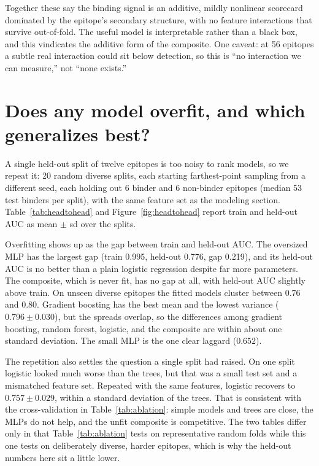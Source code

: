 \documentclass[11pt]{article}
\begin{document}
Together these say the binding signal is an additive, mildly nonlinear scorecard dominated by the
epitope's secondary structure, with no feature interactions that survive out-of-fold. The useful model is
interpretable rather than a black box, and this vindicates the additive form of the composite. One caveat:
at 56 epitopes a subtle real interaction could sit below detection, so this is ``no interaction we can
measure,'' not ``none exists.''

\section{Does any model overfit, and which generalizes best?}

A single held-out split of twelve epitopes is too noisy to rank models, so we repeat it: 20 random
diverse splits, each starting farthest-point sampling from a different seed, each holding out 6 binder
and 6 non-binder epitopes (median 53 test binders per split), with the same feature set as the modeling
section. Table~\ref{tab:headtohead} and Figure~\ref{fig:headtohead} report train and held-out AUC as
mean $\pm$ sd over the splits.

Overfitting shows up as the gap between train and held-out AUC. The oversized MLP has the largest gap
(train 0.995, held-out 0.776, gap 0.219), and its held-out AUC is no better than a plain logistic
regression despite far more parameters. The composite, which is never fit, has no gap at all, with
held-out AUC slightly above train. On unseen diverse epitopes the fitted models cluster between 0.76 and 0.80. Gradient boosting has
the best mean and the lowest variance ($0.796 \pm 0.030$), but the spreads overlap, so the differences
among gradient boosting, random forest, logistic, and the composite are within about one standard
deviation. The small MLP is the one clear laggard ($0.652$).

The repetition also settles the question a single split had raised. On one split logistic looked much
worse than the trees, but that was a small test set and a mismatched feature set. Repeated with the same
features, logistic recovers to $0.757 \pm 0.029$, within a standard deviation of the trees. That is
consistent with the cross-validation in Table~\ref{tab:ablation}: simple models and trees are close, the
MLPs do not help, and the unfit composite is competitive. The two tables differ only in that
Table~\ref{tab:ablation} tests on representative random folds while this one tests on deliberately
diverse, harder epitopes, which is why the held-out numbers here sit a little lower.
\end{document}
